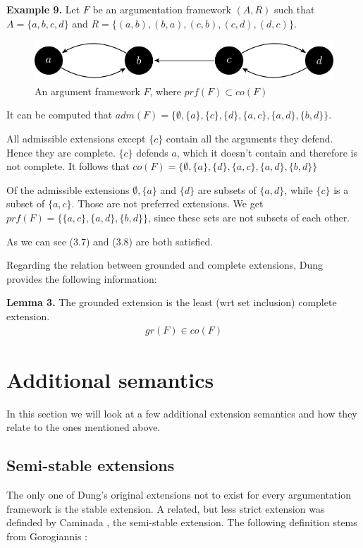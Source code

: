 \documentclass[draft,final]{vutinfth} %
\newcommand{\hl}{\par\vspace{6pt}} %
\newcommand{\cl}{\par\vspace{12pt}} %
\begin{document}
\textbf{Example 9.} Let $F$ be an argumentation framework $(A,R)$ such that $A=\{a,b,c,d\}$ and $R=\{(a,b),(b,a),(c,b),(c,d),(d,c)\}$.\hl

\FloatBarrier
	\begin{figure}[!h]
		\centering
		\includegraphics[width=\linewidth]{graphs/ex3.pdf}
		\caption{An argument framework $F$, where $prf(F)\subset co(F)$}
	\end{figure}
\FloatBarrier

It can be computed that $adm(F)=\{\emptyset,\{a\},\{c\},\{d\},\{a,c\},\{a,d\},\{b,d\}\}$.\hl
All admissible extensions except $\{c\}$ contain all the arguments they defend. Hence they are complete. $\{c\}$ defends $a$, which it doesn't contain and therefore is not complete. It follows that $co(F)=\{\emptyset,\{a\},\{d\},\{a,c\},\{a,d\},\{b,d\}\}$\hl
Of the admissible extensions $\emptyset,\{a\}$ and $\{d\}$ are subsets of $\{a,d\}$, while $\{c\}$ is a subset of $\{a,c\}$. Those are not preferred extensions. We get $prf(F)=\{\{a,c\},\{a,d\},\{b,d\}\}$, since these sets are not subsets of each other.\hl
As we can see (3.7) and (3.8) are both satisfied.\cl

Regarding the relation between grounded and complete extensions, Dung \cite{Dung} provides the following information:\hl

\textbf{Lemma 3.} The grounded extension is the least (wrt set inclusion) complete extension.
\begin{align}
	gr(F)\in co(F)
\end{align}\cl

\section{Additional semantics}
In this section we will look at a few additional extension semantics and how they relate to the ones mentioned above.

\subsection{Semi-stable extensions}
The only one of Dung's original extensions not to exist for every argumentation framework is the stable extension. A related, but less strict extension was definded by Caminada \cite{Caminada}, the semi-stable extension. The following definition stems from Gorogiannis \cite{Gorogiannis}:\hl
\end{document}
